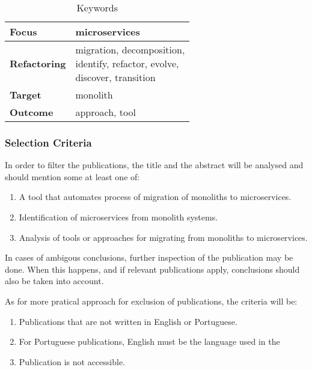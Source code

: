 \documentclass{article}
\newcommand{\wrap}[1]{\parbox{.33\linewidth}{\vspace{1.5mm}#1\vspace{1mm}}}
\begin{document}
\begin{table}[H] \caption{Keywords} \label{tab:keywords}
  \begin{center}
    \begin{tabular}[c]{l|l} {\textbf{Focus}} & microservices \\
      \hline \textbf{Refactoring} & {\wrap{ migration, decomposition,\\
          identify, refactor, evolve,\\
      discover, transition }} \\
      \hline \textbf{Target} & monolith \\
      \hline \textbf{Outcome} & approach, tool \\
    \end{tabular}
  \end{center}
\end{table}


\subsubsection{Selection Criteria} \label{sub:selection-criteria}

In order to filter the publications, the title and the abstract will be
analysed and should mention some at least one of:

\begin{enumerate}[{IC}1.]
  \item A tool that automates process of migration of monoliths to
    microservices.
  \item Identification of microservices from monolith systems.
  \item Analysis of tools or approaches for migrating from monoliths to
    microservices.
\end{enumerate}

In cases of ambigous conclusions, further inspection of the publication may
be done. When this happens, and if relevant publications apply, conclusions
should also be taken into account.

As for more pratical approach for exclusion of publications, the criteria
will be:

\begin{enumerate}[{EC}1.]
  \item Publications that are not written in English or Portuguese.
  \item For Portuguese publications, English must be the language used in
    the
  \item Publication is not accessible.
\end{enumerate}
\end{document}
